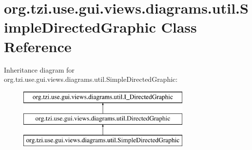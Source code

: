 \hypertarget{classorg_1_1tzi_1_1use_1_1gui_1_1views_1_1diagrams_1_1util_1_1_simple_directed_graphic}{\section{org.\-tzi.\-use.\-gui.\-views.\-diagrams.\-util.\-Simple\-Directed\-Graphic Class Reference}
\label{classorg_1_1tzi_1_1use_1_1gui_1_1views_1_1diagrams_1_1util_1_1_simple_directed_graphic}
}
Inheritance diagram for org.\-tzi.\-use.\-gui.\-views.\-diagrams.\-util.\-Simple\-Directed\-Graphic\-:\begin{figure}[H]
\begin{center}
\leavevmode
\includegraphics[height=3.000000cm]{classorg_1_1tzi_1_1use_1_1gui_1_1views_1_1diagrams_1_1util_1_1_simple_directed_graphic}
\end{center}
\end{figure}
